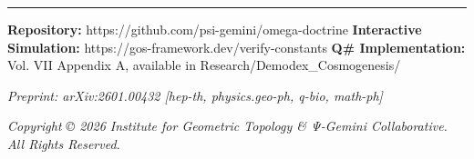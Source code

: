 \documentclass[11pt,a4paper]{article}
\begin{document}
\vspace{2em}

\hrule
\vspace{1em}

\noindent \textbf{Repository:} https://github.com/psi-gemini/omega-doctrine  
\noindent \textbf{Interactive Simulation:} https://gos-framework.dev/verify-constants  
\noindent \textbf{Q\# Implementation:} Vol. VII Appendix A, available in Research/Demodex\_Cosmogenesis/  

\vspace{1em}
\noindent \textit{Preprint: arXiv:2601.00432 [hep-th, physics.geo-ph, q-bio, math-ph]}

\noindent \textit{Copyright © 2026 Institute for Geometric Topology \& Ψ-Gemini Collaborative. All Rights Reserved.}
\end{document}

